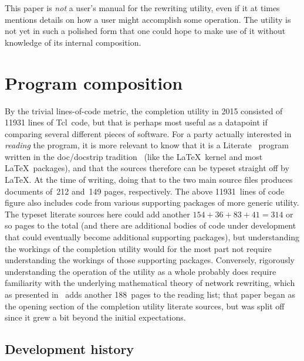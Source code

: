 \documentclass{article}
\theoremstyle{definition}
\begin{document}
This paper is \emph{not} a user's manual for the rewriting utility, 
even if it at times mentions details on how a user might accomplish 
some operation. The utility is not yet in such a polished form that 
one could hope to make use of it without knowledge of its internal 
composition.


\section{Program composition}
\label{Sec:Program}

By the trivial lines-of-code metric, the completion utility in 2015 
consisted of 11931 lines of Tcl~code, but that is perhaps most useful 
as a datapoint if comparing several different pieces of software. For 
a party actually interested in \emph{reading} the program, it is more 
relevant to know that it is a Literate~\cite{Knuth:Literate} program 
written in the \textsf{doc}\slash \textsf{docstrip} 
tradition~\cite{Mittelbach:TB10-2-245} (like the \LaTeX\ kernel and 
most \LaTeX\ packages), and that the sources therefore can be typeset 
straight off by \LaTeX. At the time of writing, doing that to the two 
main source files produces documents of~212 and~149 pages, 
respectively. 
The above 11931~lines of code figure also includes code from various 
supporting packages of more generic utility. The typeset literate 
sources here could add another \(154 + 36 + 83 + 41 = 314\) or so pages 
to the total (and there are additional bodies of code under 
development that could eventually become additional supporting 
packages), but understanding the workings of the completion utility 
would for the most part not require understanding the workings of 
those supporting packages. Conversely, rigorously understanding the 
operation of the utility as a whole probably does require familiarity 
with the underlying mathematical theory of network rewriting, which 
as presented in~\cite{NR1} adds another 188~pages to the reading 
list; that paper began as the opening section of the completion 
utility literate sources, but was split off since it grew a bit 
beyond the initial expectations.




\subsection{Development history}
\end{document}
